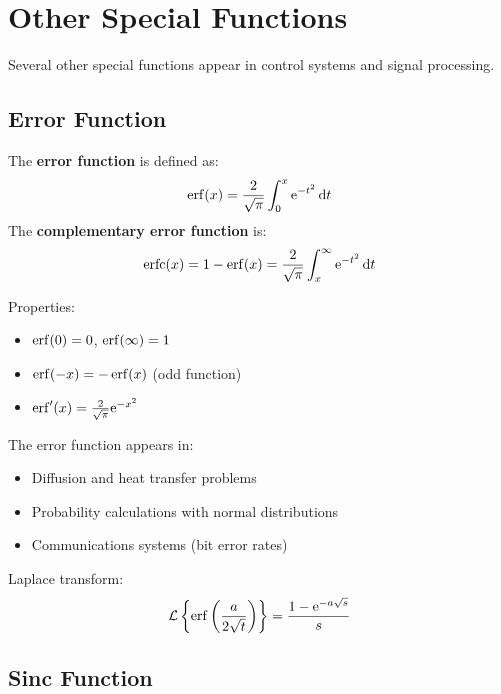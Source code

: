\section{Other Special Functions}

Several other special functions appear in control systems and signal processing.

\subsection{Error Function}

\begin{definitionbox}[title=Definition 10.10: Error Function]
The \textbf{error function} is defined as:
\begin{equation}
\operatorname{erf}(x) = \frac{2}{\sqrt{\pi}}\int_0^x \mathrm{e}^{-t^2} \, \mathrm{d} t
\end{equation}
The \textbf{complementary error function} is:
\begin{equation}
\operatorname{erfc}(x) = 1 - \operatorname{erf}(x) = \frac{2}{\sqrt{\pi}}\int_x^\infty \mathrm{e}^{-t^2} \, \mathrm{d} t
\end{equation}
\end{definitionbox}

Properties:
\begin{itemize}
    \item $\operatorname{erf}(0) = 0$, $\operatorname{erf}(\infty) = 1$
    \item $\operatorname{erf}(-x) = -\operatorname{erf}(x)$ (odd function)
    \item $\operatorname{erf}'(x) = \frac{2}{\sqrt{\pi}}\mathrm{e}^{-x^2}$
\end{itemize}

The error function appears in:
\begin{itemize}
    \item Diffusion and heat transfer problems
    \item Probability calculations with normal distributions
    \item Communications systems (bit error rates)
\end{itemize}

Laplace transform:
\begin{equation}
\mathcal{L}\left\{\operatorname{erf}\left(\frac{a}{2\sqrt{t}}\right)\right\} = \frac{1 - \mathrm{e}^{-a\sqrt{s}}}{s}
\end{equation}

\subsection{Sinc Function}

